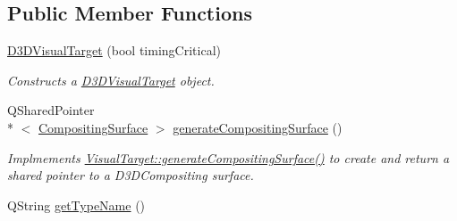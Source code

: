 \subsection*{Public Member Functions}
\begin{DoxyCompactItemize}
\item 
\hyperlink{class_picto_1_1_d3_d_visual_target_a6a80056eca2a58d1cca22bec7ec26b70}{D3\-D\-Visual\-Target} (bool timing\-Critical)
\begin{DoxyCompactList}\small\item\em Constructs a \hyperlink{class_picto_1_1_d3_d_visual_target}{D3\-D\-Visual\-Target} object. \end{DoxyCompactList}\item 
\hypertarget{class_picto_1_1_d3_d_visual_target_a1cf4a3dc52eea554789228fc86f6b3f7}{Q\-Shared\-Pointer\\*
$<$ \hyperlink{struct_picto_1_1_compositing_surface}{Compositing\-Surface} $>$ \hyperlink{class_picto_1_1_d3_d_visual_target_a1cf4a3dc52eea554789228fc86f6b3f7}{generate\-Compositing\-Surface} ()}\label{class_picto_1_1_d3_d_visual_target_a1cf4a3dc52eea554789228fc86f6b3f7}

\begin{DoxyCompactList}\small\item\em Implmements \hyperlink{class_picto_1_1_visual_target_ac4a01741b91fa6a984e18453d47b9da8}{Visual\-Target\-::generate\-Compositing\-Surface()} to create and return a shared pointer to a D3\-D\-Compositing surface. \end{DoxyCompactList}\item 
\hypertarget{class_picto_1_1_d3_d_visual_target_acb83fc4f0cf4f3c86cbec1106d9232cc}{Q\-String \hyperlink{class_picto_1_1_d3_d_visual_target_acb83fc4f0cf4f3c86cbec1106d9232cc}{get\-Type\-Name} ()}\label{class_picto_1_1_d3_d_visual_target_acb83fc4f0cf4f3c86cbec1106d9232cc}


\end{DoxyCompactItemize}
